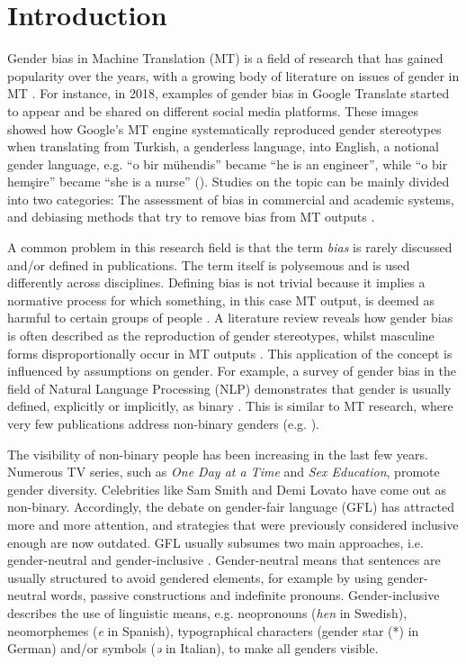 \chapter{Introduction}

\label{introduction}

Gender bias in Machine Translation (MT) is a field of research that has gained popularity over the years, with a growing body of literature on issues of gender in MT \citep{savoldi2021gender}. For instance, in 2018, examples of gender bias in Google Translate started to appear and be shared on different social media platforms. These images showed how Google's MT engine systematically reproduced gender stereotypes when translating from Turkish, a genderless language, into English, a notional gender language, e.g. ``o bir mühendis'' became ``he is an engineer'', while ``o bir hemşire'' became ``she is a nurse'' (\cite{olson2018algorithm}). Studies on the topic can be mainly divided into two categories: The assessment of bias in commercial and academic systems, and debiasing methods that try to remove bias from MT outputs \citep{savoldi2021gender}. 

A common problem in this research field is that the term \textit{bias} is rarely discussed and/or defined in publications. The term itself is polysemous \citep{crawford2017keynote} and is used differently across disciplines. Defining bias is not trivial because it implies a normative process for which something, in this case MT output, is deemed as harmful to certain groups of people \citep{blodgett-etal-2020-language}. A literature review reveals how gender bias is often described as %
the reproduction of gender stereotypes, whilst masculine forms disproportionally occur in MT outputs \citep{savoldi2021gender}. This application of the concept is influenced by assumptions on gender. For example, a survey of gender bias in the field of Natural Language Processing (NLP) demonstrates that gender is usually defined, explicitly or implicitly, as binary \citep{stanczak2021survey}. This is similar to MT research, where very few publications address non-binary genders (e.g. \cite{dev-etal-2021-harms,burtscher-2022-genderfairmt}).

The visibility of non-binary people has been increasing in the last few years. Numerous TV series, such as \textit{One Day at a Time} and \textit{Sex Education}, promote gender diversity. Celebrities like Sam Smith and Demi Lovato have come out as non-binary. Accordingly, the debate on gender-fair language (GFL) has attracted more and more attention, and  strategies that were previously considered inclusive enough are now outdated. GFL usually subsumes two main approaches, i.e. gender-neutral and gender-inclusive \citep{sczesny2016can,hornscheidt2021wie}. Gender-neutral means that sentences are usually structured to avoid gendered elements, for example by using gender-neutral words, passive constructions and indefinite pronouns. Gender-inclusive describes the use of linguistic means, e.g. neopronouns (\textit{hen} in Swedish), neomorphemes (\textit{e} in Spanish), typographical characters (gender star (*) in German) and/or symbols (\textit{ə} in Italian), to make all genders visible. 

